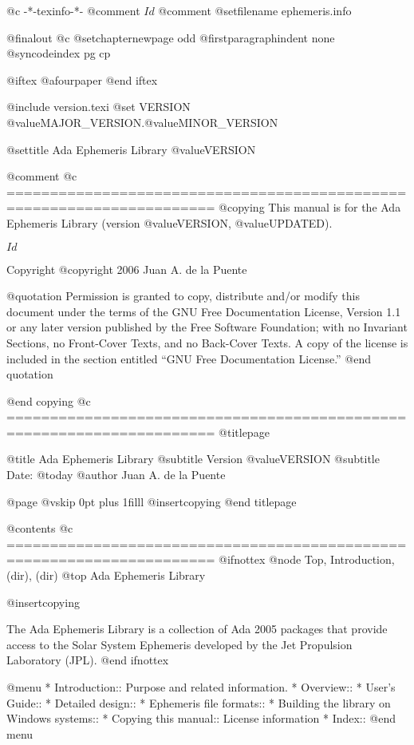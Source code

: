    @c -*-texinfo-*-
@comment $Id$
@comment %
@setfilename ephemeris.info

@finalout
@c @setchapternewpage odd
@firstparagraphindent none
@syncodeindex pg cp

@iftex
@afourpaper
@end iftex

@include version.texi
@set VERSION @value{MAJOR_VERSION}.@value{MINOR_VERSION}

@settitle Ada Ephemeris Library @value{VERSION}

@comment %
@c ======================================================================
@copying
This manual is for the Ada Ephemeris Library (version @value{VERSION},
@value{UPDATED}).

$Id$

Copyright @copyright{} 2006 Juan A. de la Puente

@quotation
Permission is granted to copy, distribute and/or modify this document
under the terms of the GNU Free Documentation License, Version 1.1 or
any later version published by the Free Software Foundation; with no
Invariant Sections, no Front-Cover Texts, and no Back-Cover Texts.  A
copy of the license is included in the section entitled ``GNU Free
Documentation License.''
@end quotation


@end copying
@c ======================================================================
@titlepage

@title Ada Ephemeris Library
@subtitle Version @value{VERSION}
@subtitle Date: @today{}
@author Juan A. de la Puente

@page
@vskip 0pt plus 1filll
@insertcopying
@end titlepage

@contents
@c ======================================================================
@ifnottex
@node Top, Introduction, (dir), (dir)
@top Ada Ephemeris Library

@insertcopying

The Ada Ephemeris Library is a collection of Ada 2005 packages that
provide access to the Solar System Ephemeris developed by the
Jet Propulsion Laboratory (JPL).
@end ifnottex

@menu
* Introduction::                Purpose and related information.
* Overview::                    
* User's Guide::                
* Detailed design::             
* Ephemeris file formats::      
* Building the library on Windows systems::  
* Copying this manual::         License information
* Index::                       
@end menu

